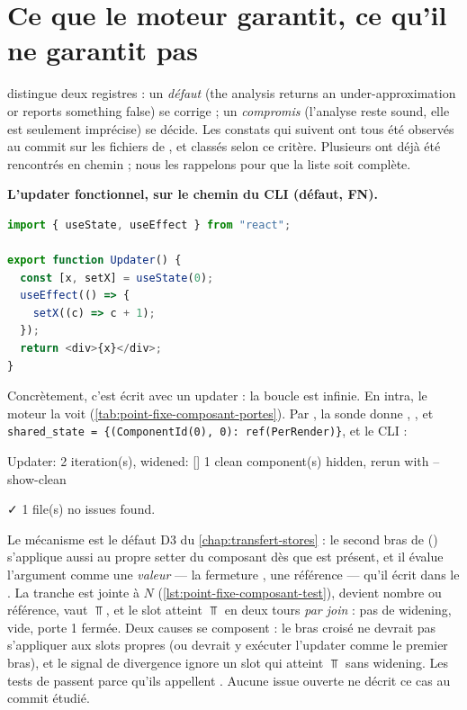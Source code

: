\section{Ce que le moteur garantit, ce qu'il ne garantit pas}
\label{sec:point-fixe-composant-trous}

 distingue deux registres : un \emph{défaut}
(\og the analysis returns an under-approximation or reports something
false\fg) se corrige ; un \emph{compromis} (l'analyse reste sound, elle
est seulement imprécise) se décide. Les constats qui suivent ont tous été
observés au commit \snapshotCommit{} sur les fichiers de , et
classés selon ce critère. Plusieurs ont déjà été rencontrés en chemin ; nous
les rappelons pour que la liste soit complète.

\begin{piege}
\textbf{L'updater fonctionnel, sur le chemin du CLI (défaut, FN).}
\begin{lstlisting}[language=TypeScript,caption={\file{/tmp/ch13/updater.tsx}},label={lst:point-fixe-composant-updater}]
import { useState, useEffect } from "react";

export function Updater() {
  const [x, setX] = useState(0);
  useEffect(() => {
    setX((c) => c + 1);
  });
  return <div>{x}</div>;
}
\end{lstlisting}
Concrètement, c'est  écrit avec un updater : la boucle est
infinie. En intra, le moteur la voit (\cref{tab:point-fixe-composant-portes}).
Par , la sonde donne ,
,  et
\texttt{shared\_state = \{(ComponentId(0), 0): ref(PerRender)\}}, et le CLI :
\begin{sortie}
  [verbose] Updater: 2 iteration(s), widened: []
   1 clean component(s) hidden, rerun with --show-clean

✓  1 file(s) no issues found.
\end{sortie}
Le mécanisme est le défaut D3 du \cref{chap:transfert-stores} : le second bras
de  ()
s'applique aussi au propre setter du composant dès que  est
présent, et il évalue l'argument comme une \emph{valeur} --- la fermeture
, une référence  --- qu'il écrit dans le
. La tranche est jointe à $N$
(\cref{lst:point-fixe-composant-test}),  devient \og nombre ou
référence\fg,  vaut $\Top$, et le slot atteint $\Top$ en deux
tours \emph{par join} : pas de widening,  vide, porte 1
fermée. Deux causes se composent : le bras croisé ne devrait pas s'appliquer
aux slots propres (ou devrait y exécuter l'updater comme le premier bras), et
le signal de divergence ignore un slot qui atteint $\Top$ sans widening. Les
tests de  passent parce qu'ils appellent
. Aucune issue ouverte ne décrit ce cas au commit
étudié.
\end{piege}

